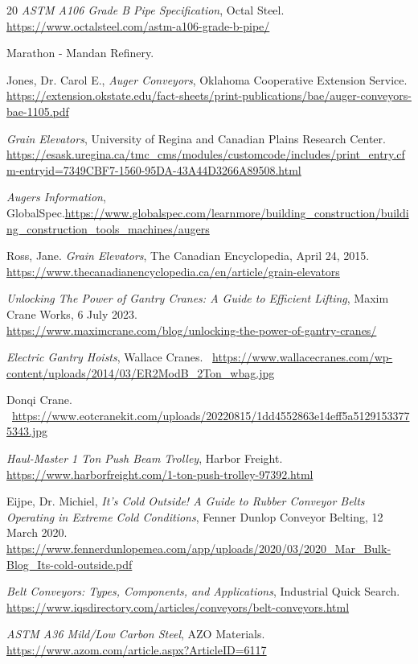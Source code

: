 \documentclass[10pt]{project}
\begin{document}
\begin{thebibliography}{20}
\textit{ASTM A106 Grade B Pipe Specification}, Octal Steel.
\url{https://www.octalsteel.com/astm-a106-grade-b-pipe/}


Marathon - Mandan Refinery.

Jones, Dr. Carol E., \textit{Auger Conveyors}, Oklahoma Cooperative Extension Service.
\url{https://extension.okstate.edu/fact-sheets/print-publications/bae/auger-conveyors-bae-1105.pdf}

\textit{Grain Elevators}, University of Regina and Canadian Plains Research Center.
\url{https://esask.uregina.ca/tmc_cms/modules/customcode/includes/print_entry.cfm-entryid=7349CBF7-1560-95DA-43A44D3266A89508.html}

\textit{Augers Information}, GlobalSpec.\url{https://www.globalspec.com/learnmore/building_construction/building_construction_tools_machines/augers}

 Ross, Jane.  \textit{Grain Elevators}, The Canadian Encyclopedia, April 24, 2015.
\url{https://www.thecanadianencyclopedia.ca/en/article/grain-elevators}

\textit{Unlocking The Power of Gantry Cranes: A Guide to Efficient Lifting}, Maxim Crane Works, 6 July 2023.\\
\url{https://www.maximcrane.com/blog/unlocking-the-power-of-gantry-cranes/}

\textit{Electric Gantry Hoists}, Wallace Cranes.
~\url{https://www.wallacecranes.com/wp-content/uploads/2014/03/ER2ModB_2Ton_wbag.jpg}

Donqi Crane.
~\url{https://www.eotcranekit.com/uploads/20220815/1dd4552863e14eff5a51291533775343.jpg}

\textit{Haul-Master 1 Ton Push Beam Trolley}, Harbor Freight.
\url{https://www.harborfreight.com/1-ton-push-trolley-97392.html}

Eijpe, Dr. Michiel, \textit{It's Cold Outside!  A Guide to Rubber Conveyor Belts Operating in Extreme Cold Conditions}, Fenner Dunlop Conveyor Belting, 12 March 2020.
\url{https://www.fennerdunlopemea.com/app/uploads/2020/03/2020_Mar_Bulk-Blog_Its-cold-outside.pdf}

\textit{Belt Conveyors: Types, Components, and Applications}, Industrial Quick Search.
\url{https://www.iqsdirectory.com/articles/conveyors/belt-conveyors.html}

\textit{ASTM A36 Mild/Low Carbon Steel}, AZO Materials.
\url{https://www.azom.com/article.aspx?ArticleID=6117}


\end{thebibliography}
\end{document}
